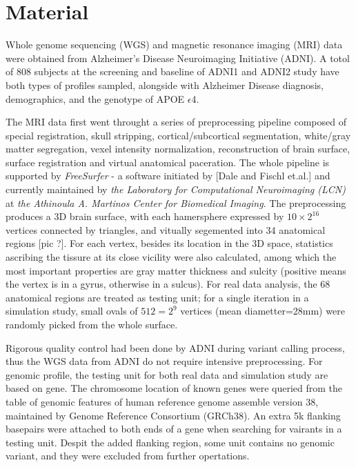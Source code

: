 \section{Material}
Whole genome sequencing (WGS) and magnetic resonance imaging (MRI) data were obtained from Alzheimer’s Disease Neuroimaging Initiative (ADNI). A totol of 808 subjects at the screening and baseline of ADNI1 and ADNI2 study have both types of profiles sampled, alongside with Alzheimer Disease diagnosis, demographics, and the genotype of APOE $\epsilon$4.

The MRI data first went throught a series of preprocessing pipeline composed of special registration, skull stripping, cortical/subcortical segmentation, white/gray matter segregation, vexel intensity normalization, reconstruction of brain surface, surface registration and virtual anatomical paceration. The whole pipeline is supported by \emph{FreeSurfer} - a software initiated by [Dale and Fischl et.al.] and currently maintained by \textit{the Laboratory for Computational Neuroimaging (LCN)}  at \textit {the Athinoula A. Martinos Center for Biomedical Imaging}. The preprocessing produces a 3D brain surface, with each hamersphere expressed by $10\times2^16$ vertices connected by triangles, and vitually segemented into 34 anatomical regions [pic ?]. For each vertex, besides its location in the 3D space, statistics ascribing the tissure at its close vicility were also calculated, among which the most important properties are gray matter thickness and sulcity (positive means the vertex is in a gyrus, otherwise in a sulcus). For real data analysis, the 68 anatomical regions are treated as testing unit; for a single iteration in a simulation study, small ovals of $512=2^9$ vertices (mean diametter=28mm) were randomly picked from the whole surface.

Rigorous quality control had been done by ADNI during variant calling process, thus the WGS data from ADNI do not require intensive preprocessing. For genomic profile, the testing unit for both real data and simulation study are based on gene. The chromosome location of known genes were queried from the table of genomic features of human reference genome assemble version 38, maintained by Genome Reference Consortium (GRCh38). An extra 5k flanking basepairs were attached to both ends of a gene when searching for vairants in a testing unit. Despit the added flanking region, some unit contains no genomic variant, and they were excluded from further opertations.